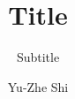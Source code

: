 \documentclass{beamer}
\title[About Beamer] %
{Title}
\subtitle{Subtitle}
\author[Yu-Zhe Shi] %
{Yu-Zhe Shi}
\begin{document}
\maketitle
\begin{frame}
    \frametitle{}
    
        

\end{frame}
\end{document}
